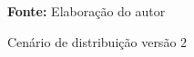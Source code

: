 \begin{figure}[ht!]
\centering

\caption{\textmd{Cenário de distribuição versão 2}}
\label{fig:cenario2}

\par\medskip\textbf{Fonte:} Elaboração do autor \par\medskip
\end{figure}

